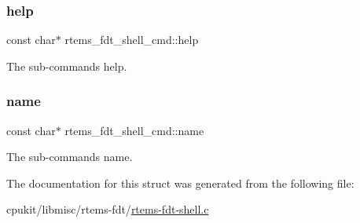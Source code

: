 \subsubsection{\texorpdfstring{help}{help}}
{\footnotesize\ttfamily const char$\ast$ rtems\+\_\+fdt\+\_\+shell\+\_\+cmd\+::help}

The sub-\/command\textquotesingle{}s help. \mbox{\label{structrtems__fdt__shell__cmd_a6e8ea4e5d060bf3867ae7c29f8c3e310}} 
\subsubsection{\texorpdfstring{name}{name}}
{\footnotesize\ttfamily const char$\ast$ rtems\+\_\+fdt\+\_\+shell\+\_\+cmd\+::name}

The sub-\/command\textquotesingle{}s name. 

The documentation for this struct was generated from the following file\+:\begin{DoxyCompactItemize}
\item 
cpukit/libmisc/rtems-\/fdt/\mbox{\hyperlink{rtems-fdt-shell_8c}{rtems-\/fdt-\/shell.\+c}}\end{DoxyCompactItemize}
